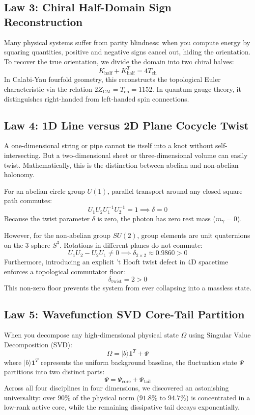 \documentclass[11pt,a4paper]{article}
\begin{document}
\subsection{Law 3: Chiral Half-Domain Sign Reconstruction}
Many physical systems suffer from parity blindness: when you compute energy by squaring quantities, positive and negative signs cancel out, hiding the orientation. To recover the true orientation, we divide the domain into two chiral halves:
$$K_{\mathrm{half}} + K_{\mathrm{half}}^T = 4 T_{\mathrm{ch}}$$
In Calabi-Yau fourfold geometry, this reconstructs the topological Euler characteristic via the relation $2 Z_{\mathrm{CM}} = T_{\mathrm{ch}} = 1152$. In quantum gauge theory, it distinguishes right-handed from left-handed spin connections.

\subsection{Law 4: 1D Line versus 2D Plane Cocycle Twist}
A one-dimensional string or pipe cannot tie itself into a knot without self-intersecting. But a two-dimensional sheet or three-dimensional volume can easily twist. Mathematically, this is the distinction between abelian and non-abelian holonomy.

For an abelian circle group $U(1)$, parallel transport around any closed square path commutes:
$$U_1 U_2 U_1^{-1} U_2^{-1} = 1 \implies \delta = 0$$
Because the twist parameter $\delta$ is zero, the photon has zero rest mass ($m_{\gamma} = 0$).

However, for the non-abelian group $SU(2)$, group elements are unit quaternions on the 3-sphere $S^3$. Rotations in different planes do not commute:
$$U_1 U_2 - U_2 U_1 \neq 0 \implies \delta_{2\times 2} \approx 0.9860 > 0$$
Furthermore, introducing an explicit 't Hooft twist defect in 4D spacetime enforces a topological commutator floor:
$$\delta_{\mathrm{twist}} = 2 > 0$$
This non-zero floor prevents the system from ever collapsing into a massless state.

\subsection{Law 5: Wavefunction SVD Core-Tail Partition}
When you decompose any high-dimensional physical state $\Omega$ using Singular Value Decomposition (SVD):
$$\Omega = |b\rangle \mathbf{1}^T + \Psi$$
where $|b\rangle \mathbf{1}^T$ represents the uniform background baseline, the fluctuation state $\Psi$ partitions into two distinct parts:
$$\Psi = \Psi_{\mathrm{core}} + \Psi_{\mathrm{tail}}$$
Across all four disciplines in four dimensions, we discovered an astonishing universality: over $90\%$ of the physical norm ($91.8\%$ to $94.7\%$) is concentrated in a low-rank active core, while the remaining dissipative tail decays exponentially.
\end{document}
